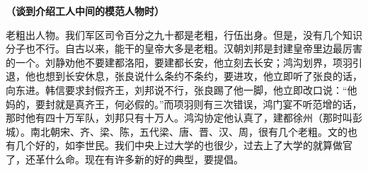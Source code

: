 \textbf{（谈到介绍工人中间的模范人物时）}

老粗出人物。我们军区司令百分之九十都是老粗，行伍出身。但是，没有几个知识分子也不行。自古以来，能干的皇帝大多是老粗。汉朝刘邦是封建皇帝里边最厉害的一个。刘静劝他不要建都洛阳，要建都长安，他立刻去长安；鸿沟划界，项羽引退，他也想到长安休息，张良说什么条约不条约，要进攻，他立即听了张良的话，向东进。韩信要求封假齐王，刘邦说不行，张良踢了他一脚，他立即改口说：“他妈的，要封就是真齐王，何必假的。”而项羽则有三次错误，鸿门宴不听范增的话，那时他有四十万军队，刘邦只有十万人。鸿沟协定他认真了，建都徐州（那时叫彭城）。南北朝宋、齐、梁、陈，五代梁、唐、晋、汉、周，很有几个老粗。文的也有几个好的，如李世民。我们中央上过大学的也很少，过去上了大学的就算做官了，还革什么命。现在有许多新的好的典型，要提倡。

